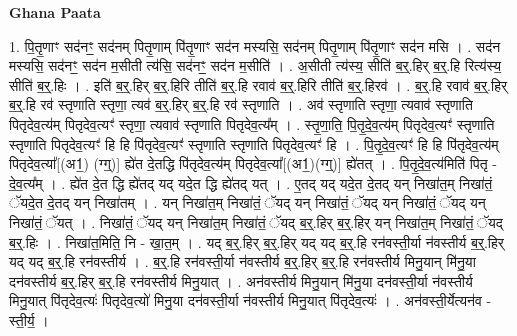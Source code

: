 \documentclass[17pt]{extarticle}
\begin{document}
\textbf{Ghana Paata } \newline

1. पि॒तृ॒णाꣳ सद॑नꣳ॒॒ सद॑नम् पितृ॒णाम् पि॑तृ॒णाꣳ सद॑न मस्यसि॒ सद॑नम् पितृ॒णाम् पि॑तृ॒णाꣳ सद॑न मसि । . सद॑न मस्यसि॒ सद॑नꣳ॒॒ सद॑न म॒सीती त्य॑सि॒ सद॑नꣳ॒॒ सद॑न म॒सीति॑ । . अ॒सीती त्य॑स्य॒ सीति॑ ब॒र्॒.हिर् ब॒र्॒.हि रित्य॑स्य॒ सीति॑ ब॒र्॒.हिः । . इति॑ ब॒र्॒.हिर् ब॒र्॒.हिरि तीति॑ ब॒र्॒.हि रवाव॑ ब॒र्॒.हिरि तीति॑ ब॒र्॒.हिरव॑ । . ब॒र्॒.हि रवाव॑ ब॒र्॒.हिर् ब॒र्॒.हि रव॑ स्तृणाति स्तृणा॒ त्यव॑ ब॒र्॒.हिर् ब॒र्॒.हि रव॑ स्तृणाति । . अव॑ स्तृणाति स्तृणा॒ त्यवाव॑ स्तृणाति पितृदेव॒त्य॑म् पितृदेव॒त्यꣳ॑ स्तृणा॒ त्यवाव॑ स्तृणाति पितृदेव॒त्य᳚म् । . स्तृ॒णा॒ति॒ पि॒तृ॒दे॒व॒त्य॑म् पितृदेव॒त्यꣳ॑ स्तृणाति स्तृणाति पितृदेव॒त्यꣳ॑ हि हि पि॑तृदेव॒त्यꣳ॑ स्तृणाति स्तृणाति पितृदेव॒त्यꣳ॑ हि । . पि॒तृ॒दे॒व॒त्यꣳ॑ हि हि पि॑तृदेव॒त्य॑म् पितृदेव॒त्या᳚[(अ1॒) (ग्ग्॒)] ह्ये॑त दे॒तद्धि पि॑तृदेव॒त्य॑म् पितृदेव॒त्या᳚[(अ1॒)(ग्ग्॒)] ह्ये॑तत् । . पि॒तृ॒दे॒व॒त्य॑मिति॑ पितृ - दे॒व॒त्य᳚म् । . ह्ये॑त दे॒त द्धि ह्ये॑तद् यद् यदे॒त द्धि ह्ये॑तद् यत् । . ए॒तद् यद् यदे॒त दे॒तद् यन् निखा॑त॒म् निखा॑तं॒ ॅयदे॒त दे॒तद् यन् निखा॑तम् । . यन् निखा॑त॒म् निखा॑तं॒ ॅयद् यन् निखा॑तं॒ ॅयद् यन् निखा॑तं॒ ॅयद् यन् निखा॑तं॒ ॅयत् । . निखा॑तं॒ ॅयद् यन् निखा॑त॒म् निखा॑तं॒ ॅयद् ब॒र्॒.हिर् ब॒र्॒.हिर् यन् निखा॑त॒म् निखा॑तं॒ ॅयद् ब॒र्॒.हिः । . निखा॑त॒मिति॒ नि - खा॒त॒म् । . यद् ब॒र्॒.हिर् ब॒र्॒.हिर् यद् यद् ब॒र्॒.हि रन॑वस्ती॒र्या न॑वस्तीर्य ब॒र्॒.हिर् यद् यद् ब॒र्॒.हि रन॑वस्तीर्य । . ब॒र्॒.हि रन॑वस्ती॒र्या न॑वस्तीर्य ब॒र्॒.हिर् ब॒र्॒.हि रन॑वस्तीर्य मिनु॒यान् मि॑नु॒या दन॑वस्तीर्य ब॒र्॒.हिर् ब॒र्॒.हि रन॑वस्तीर्य मिनु॒यात् । . अन॑वस्तीर्य मिनु॒यान् मि॑नु॒या दन॑वस्ती॒र्या न॑वस्तीर्य मिनु॒यात् पि॑तृदेव॒त्यः॑ पितृदेव॒त्यो॑ मिनु॒या दन॑वस्ती॒र्या न॑वस्तीर्य मिनु॒यात् पि॑तृदेव॒त्यः॑ । . अन॑वस्ती॒र्येत्यन॑व - स्ती॒र्य॒ । \newline
\end{document}

